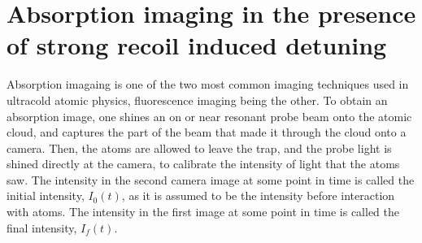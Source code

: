 \documentclass[12pt]{iopart}
\begin{document}
\section{Absorption imaging in the presence of strong recoil induced detuning}
Absorption imagaing is one of the two most common imaging techniques used in ultracold atomic physics, fluorescence imaging being the other. To obtain an absorption image, one shines an on or near resonant probe beam onto the atomic cloud, and captures the part of the beam that made it through the cloud onto a camera. Then, the atoms are allowed to leave the trap, and the probe light is shined directly at the camera, to calibrate the intensity of light that the atoms saw. The intensity in the second camera image at some point in time is called the initial intensity, $I_{0}(t)$, as it is assumed to be the intensity before interaction with atoms. The intensity in the first image at some point in time is called the final intensity, $I_f(t)$.  
\end{document}
